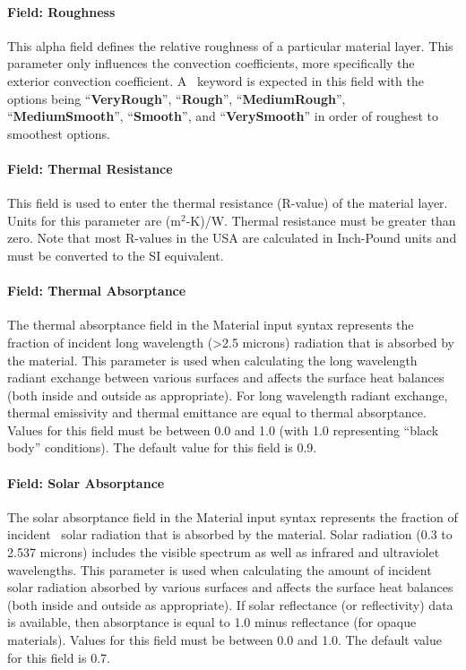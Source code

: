 \paragraph{Field: Roughness}\label{field-roughness-1}

This alpha field defines the relative roughness of a particular material layer. This parameter only influences the convection coefficients, more specifically the exterior convection coefficient. A~ keyword is expected in this field with the options being ``\textbf{VeryRough}'', ``\textbf{Rough}'', ``\textbf{MediumRough}'', ``\textbf{MediumSmooth}'', ``\textbf{Smooth}'', and ``\textbf{VerySmooth}'' in order of roughest to smoothest options.

\paragraph{Field: Thermal Resistance}\label{field-thermal-resistance}

This field is used to enter the thermal resistance (R-value) of the material layer. Units for this parameter are (m\(^{2}\)-K)/W. Thermal resistance must be greater than zero. Note that most R-values in the USA are calculated in Inch-Pound units and must be converted to the SI equivalent.

\paragraph{Field: Thermal Absorptance}\label{field-thermal-absorptance-1}

The thermal absorptance field in the Material input syntax represents the fraction of incident long wavelength (>2.5 microns) radiation that is absorbed by the material. This parameter is used when calculating the long wavelength radiant exchange between various surfaces and affects the surface heat balances (both inside and outside as appropriate). For long wavelength radiant exchange, thermal emissivity and thermal emittance are equal to thermal absorptance. Values for this field must be between 0.0 and 1.0 (with 1.0 representing ``black body'' conditions). The default value for this field is 0.9.

\paragraph{Field: Solar Absorptance}\label{field-solar-absorptance-1}

The solar absorptance field in the Material input syntax represents the fraction of incident~ solar radiation that is absorbed by the material. Solar radiation (0.3 to 2.537 microns) includes the visible spectrum as well as infrared and ultraviolet wavelengths. This parameter is used when calculating the amount of incident solar radiation absorbed by various surfaces and affects the surface heat balances (both inside and outside as appropriate). If solar reflectance (or reflectivity) data is available, then absorptance is equal to 1.0 minus reflectance (for opaque materials). Values for this field must be between 0.0 and 1.0. The default value for this field is 0.7.

